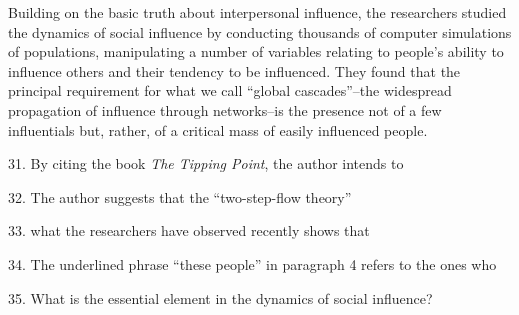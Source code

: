 \qquad Building on the basic truth about interpersonal influence, the researchers studied the dynamics of social influence by conducting thousands of computer simulations of populations, manipulating a number of variables relating to people's ability to influence others and their tendency to be influenced. They found that the principal requirement for what we call ``global cascades''--the widespread propagation of influence through networks--is the presence not of a few influentials but, rather, of a critical mass of easily influenced people.

\vspace{6pt}

31. By citing the book \emph{The Tipping Point}, the author intends to\par

32. The author suggests that the ``two-step-flow theory''\par

33. what the researchers have observed recently shows that\par

34. The underlined phrase ``these people'' in paragraph 4 refers to the ones who\par

35. What is the essential element in the dynamics of social influence?\par
